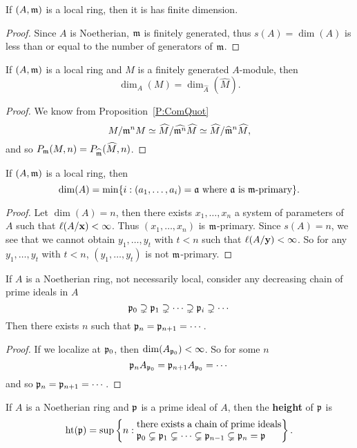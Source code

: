 \documentclass{ximera}
\begin{document}
\begin{corollary} If $(A,\mathfrak{m})$ is a local ring, then it is has finite dimension.
\end{corollary}

\begin{proof} Since $A$ is Noetherian, $\mathfrak{m}$ is finitely generated, thus $s(A)=\dim(A)$ is less than or equal to the number of generators of $\mathfrak{m}$.
\end{proof}


\begin{corollary} If $(A,\mathfrak{m})$ is a local ring and $M$ is a finitely generated $A$-module, then 
\[
\dim_A(M) =\dim_{\hat{A}}(\hat{M}).
\]
\end{corollary}

\begin{proof} We know from Proposition~\ref{P:ComQuot}
\[
M/\mathfrak{m}^n M \simeq \widehat{M}/\widehat{\mathfrak{m}^n} \widehat{M} \simeq \widehat{M}/ \widehat{\mathfrak{m}}^n\widehat{M},
\]
and so $P_{\mathfrak{m}}(M,n) = P_{\widehat{\mathfrak{m}}}(\widehat{M},n)$.
\end{proof}


\begin{corollary} If $(A,\mathfrak{m})$ is a local ring, then 
\[
\dim(A) = \min\{i: (a_1,\dots,a_i) = \mathfrak{a}\text{ where $\mathfrak{a}$ is $\mathfrak{m}$-primary}\}.
\]
\end{corollary}

\begin{proof} Let $\dim(A) = n$, then there exists $x_1,\dots,x_n$ a system of parameters of $A$ such that $\ell(A/\mathbf{x}) <\infty$. Thus $(x_1,\dots,x_n)$ is $\mathfrak{m}$-primary.  Since $s(A) = n$, we see that we cannot obtain $y_1,\dots,y_t$ with $t<n$ such that $\ell(A/\mathbf{y})<\infty$.  So for any $y_1,\ldots,y_t$ with $t < n$, $(y_1,\ldots,y_t)$ is not $\mathfrak{m}$-primary.
\end{proof}


\begin{corollary} If $A$ is a Noetherian ring, not necessarily local, consider any decreasing chain of prime ideals in $A$ 
\[
\mathfrak{p}_0\supsetneq \mathfrak{p}_1\supsetneq \cdots \supsetneq \mathfrak{p}_i\supsetneq \cdots
\]
Then there exists $n$ such that $\mathfrak{p}_n = \mathfrak{p}_{n+1} = \cdots$.
\end{corollary}

\begin{proof} If we localize at $\mathfrak{p}_0$, then $\dim(A_{\mathfrak{p}_0}) <\infty$.  So for some $n$
\[
\mathfrak{p}_n A_{\mathfrak{p}_0} = \mathfrak{p}_{n+1} A_{\mathfrak{p}_0} = \cdots
\]
and so $\mathfrak{p}_n = \mathfrak{p}_{n+1} = \cdots$.
\end{proof}

\begin{definition} If $A$ is a Noetherian ring and $\mathfrak{p}$ is a prime ideal of $A$, then the \textbf{height} of $\mathfrak{p}$ is 
\[
\h(\p) = \sup\left\{n : \begin{minipage}{15em}there exists a chain of prime ideals $\p_0\subsetneq \p_1 \subsetneq \cdots \subsetneq \p_{n-1}\subsetneq \p_n =\p$\end{minipage} \right\}.
\]
\end{definition}
\end{document}
